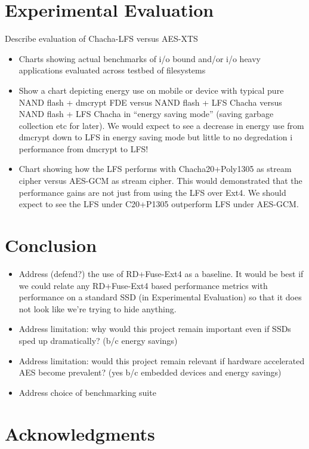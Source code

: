 \documentclass[letterpaper,twocolumn,10pt]{article}
\begin{document}
\section{Experimental Evaluation}
Describe evaluation of Chacha-LFS versus AES-XTS
\begin{itemize}
  \item Charts showing actual benchmarks of i/o bound and/or i/o heavy applications evaluated across testbed of filesystems
  \item Show a chart depicting energy use on mobile or device with typical pure NAND flash + dmcrypt FDE versus NAND
  flash + LFS Chacha versus NAND flash + LFS Chacha in ``energy saving mode'' (saving garbage collection etc for later).
  We would expect to see a decrease in energy use from dmcrypt down to LFS in energy saving mode but little to no
  degredation i performance from dmcrypt to LFS! 
  \item Chart showing how the LFS performs with Chacha20+Poly1305 as stream cipher versus AES-GCM as stream cipher. This
  would demonstrated that the performance gains are not just from using the LFS over Ext4. We should expect to see the LFS
  under C20+P1305 outperform LFS under AES-GCM.
\end{itemize}

\section{Conclusion}
\begin{itemize}
  \item Address (defend?) the use of RD+Fuse-Ext4 as a baseline. It would be best if we could relate any RD+Fuse-Ext4 based
  performance metrics with performance on a standard SSD (in Experimental Evaluation) so that it does not look like we're
  trying to hide anything.
  \item Address limitation: why would this project remain important even if SSDs sped up dramatically? (b/c energy savings)
  \item Address limitation: would this project remain relevant if hardware accelerated AES become prevalent? (yes b/c
  embedded devices and energy savings)
  \item Address choice of benchmarking suite
\end{itemize}

\section{Acknowledgments}
\end{document}
